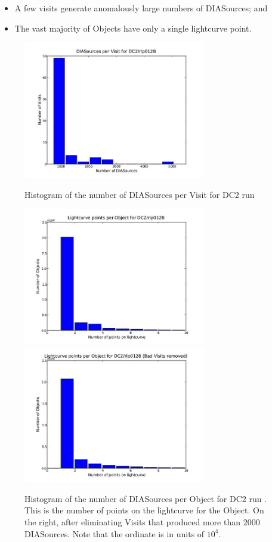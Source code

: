 \begin{itemize}
\item{A few visits generate anomalously large numbers of DIASources; and}
\item{The vast majority of Objects have only a single lightcurve point.}
\end{itemize}

\begin{figure}[htbp]
\begin{center}
\includegraphics[height=60mm] {figures/VisitHisto_rlp0128}
\caption{Histogram of the number of DIASources per Visit for DC2 run 
\label{FigDIAHist}}

\vspace{0.1\textheight}

\includegraphics[height=60mm] {figures/LCHisto_rlp0128}
\includegraphics[height=60mm] {figures/LCHistoClean_rlp0128}
\caption{Histogram of the number of DIASources per Object for DC2 run
  .  This is the number of points on the lightcurve for the
  Object. On the right, after eliminating Visits that produced more than 2000 DIASources.
  Note that the ordinate is in units of $10^4$.
\label{FigDIALCHist}}
\end{center}
\end{figure}
  
